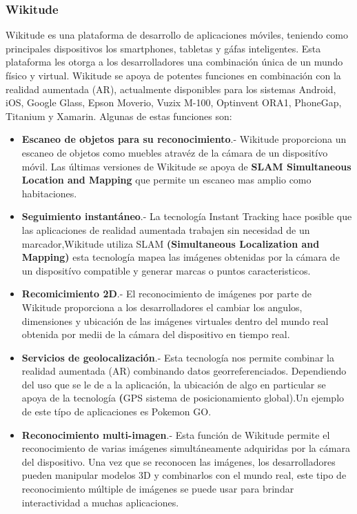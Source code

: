 \subsubsection{Wikitude}
Wikitude es una plataforma de desarrollo de aplicaciones móviles, teniendo como principales dispositivos los smartphones, tabletas y gáfas inteligentes. Esta plataforma les otorga a los desarrolladores una combinación única de un mundo físico y virtual. Wikitude se apoya de potentes funciones en combinación con la realidad aumentada (AR), actualmente disponibles para los sistemas Android, iOS, Google Glass, Epson Moverio, Vuzix M-100, Optinvent ORA1, PhoneGap, Titanium y Xamarin. Algunas de estas funciones son:\cite{B09}
\begin{itemize}
	\item \textbf{Escaneo de objetos para su reconocimiento}.- Wikitude proporciona un escaneo de objetos como muebles atravéz de la cámara de un dispositívo móvil. Las últimas versiones de Wikitude se apoya de \textbf{SLAM Simultaneous Location  and Mapping} que permite un escaneo mas amplio como habitaciones. 
	
	\item \textbf{Seguimiento instantáneo}.- La tecnología Instant Tracking hace posible que las aplicaciones de realidad aumentada trabajen sin necesidad de un marcador,Wikitude utiliza SLAM \textbf{(Simultaneous Localization and Mapping) }esta tecnología mapea las imágenes obtenidas por la cámara de un dispositívo compatible y generar marcas o puntos caracteristicos.
	
	\item \textbf{Recomicimiento 2D}.- El reconocimiento de imágenes por parte de Wikitude proporciona a los  desarrolladores el cambiar los angulos, dimensiones y ubicación de las imágenes virtuales dentro del mundo real obtenida por medii de la cámara del dispositivo en tiempo real.
	
	\item \textbf{Servicios de geolocalización}.- Esta tecnología nos permite combinar la realidad aumentada (AR) combinando datos georreferenciados. Dependiendo del uso que se le de a la aplicación, la ubicación de algo en particular se apoya de la tecnología \textbf(GPS sistema de posicionamiento global).Un ejemplo de este típo de aplicaciones es Pokemon GO. 
	
	\item \textbf{Reconocimiento multi-imagen}.- Esta función de Wikitude permite el reconocimiento de varias imágenes simultáneamente adquiridas por la cámara del dispositivo. Una vez que se reconocen las imágenes, los desarrolladores pueden manipular modelos 3D y combinarlos con el mundo real, este tipo de reconocimiento múltiple de imágenes se puede usar para brindar interactividad a muchas aplicaciones.
	

\end{itemize}
